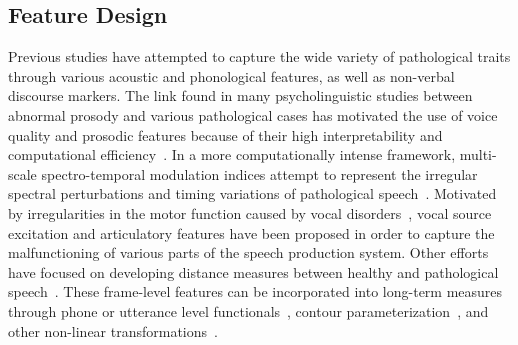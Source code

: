 \documentclass{article}
\begin{document}
\subsection{Feature Design}
Previous studies have attempted to capture the wide variety of pathological traits through various acoustic and phonological features, as well as non-verbal discourse markers.
The link found in many psycholinguistic studies between abnormal prosody and various pathological cases has motivated the use of voice quality and prosodic features because of their high interpretability and computational efficiency~\cite{van2010computational,tsanas2012novel}. 
In a more computationally intense framework, multi-scale spectro-temporal modulation indices attempt to represent the irregular spectral perturbations and timing variations of pathological speech~\cite{liss2010discriminating}. 
Motivated by irregularities in the motor function caused by vocal disorders~\cite{falk2012characterization,hahm2015parkinson}, vocal source excitation and articulatory features have been proposed in order to capture the malfunctioning of various parts of the speech production system. Other efforts have focused on developing distance measures between healthy and pathological speech~\cite{gu2005disordered}. These frame-level features can be incorporated into long-term measures through phone or utterance level functionals~\cite{kim2015automatic}, contour parameterization~\cite{kim2015automatic2}, and other non-linear transformations~\cite{kim2015automatic,an2015automatic}.
\end{document}
